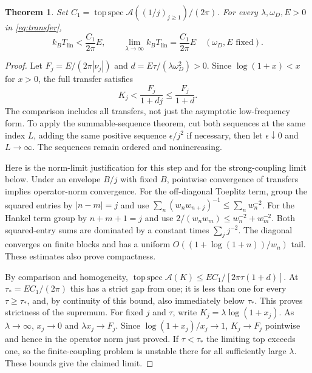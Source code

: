 \documentclass[11pt]{article}
\newtheorem{theorem}{Theorem}
\newcommand{\lin}{\mathrm{lin}}
\newcommand{\topsp}{\operatorname{top\,spec}}
\begin{document}
\begin{theorem}
Set $C_1=\topsp\mathcal A((1/j)_{j\ge1})/(2\pi)$. For every $\lambda,\omega_D,E>0$ in \eqref{eq:transfer},
\[
 k_BT_\lin< \frac{C_1}{2\pi}E,\qquad
 \lim_{\lambda\to\infty} k_BT_\lin=\frac{C_1}{2\pi}E
 \quad (\omega_D,E\text{ fixed}).
\]
\end{theorem}
\begin{proof}
Let $F_j=E/(2\pi|\nu_j|)$ and $d=E\tau/(\lambda\omega_D^2)>0$. Since $\log(1+x)<x$ for $x>0$, the full transfer satisfies
\begin{equation}
 K_j<\frac{F_j}{1+dj}\le\frac{F_j}{1+d}.
 \label{eq:envelope}
\end{equation}
The comparison includes all transfers, not just the asymptotic low-frequency form. To apply the summable-sequence theorem, cut both sequences at the same index $L$, adding the same positive sequence $\epsilon/j^2$ if necessary, then let $\epsilon\downarrow0$ and $L\to\infty$. The sequences remain ordered and nonincreasing.

Here is the norm-limit justification for this step and for the strong-coupling limit below. Under an envelope $B/j$ with fixed $B$, pointwise convergence of transfers implies operator-norm convergence. For the off-diagonal Toeplitz term, group the squared entries by $|n-m|=j$ and use $\sum_n(w_nw_{n+j})^{-1}\le\sum_n w_n^{-2}$. For the Hankel term group by $n+m+1=j$ and use $2/(w_nw_m)\le w_n^{-2}+w_m^{-2}$. Both squared-entry sums are dominated by a constant times $\sum_j j^{-2}$. The diagonal converges on finite blocks and has a uniform $O((1+\log(1+n))/w_n)$ tail. These estimates also prove compactness.

By comparison and homogeneity, $\topsp\mathcal A(K)\le EC_1/[2\pi\tau(1+d)]$. At $\tau_* = EC_1/(2\pi)$ this has a strict gap from one; it is less than one for every $\tau\ge\tau_*$, and, by continuity of this bound, also immediately below $\tau_*$. This proves strictness of the supremum. For fixed $j$ and $\tau$, write $K_j=\lambda\log(1+x_j)$. As $\lambda\to\infty$, $x_j\to0$ and $\lambda x_j\to F_j$. Since $\log(1+x_j)/x_j\to1$, $K_j\to F_j$ pointwise and hence in the operator norm just proved. If $\tau<\tau_*$ the limiting top exceeds one, so the finite-coupling problem is unstable there for all sufficiently large $\lambda$. These bounds give the claimed limit.
\end{proof}
\end{document}
